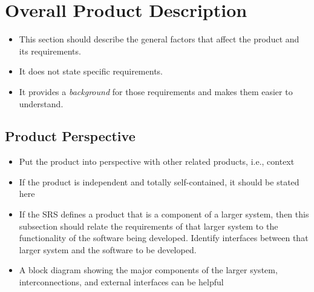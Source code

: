 \documentclass[]{article}
\begin{document}

\section{Overall Product Description}
\label{sec:overall_description}

\begin{itemize}
	\item This section should describe the general factors that affect the product and its requirements. 
	\item It does not state specific requirements.
	\item It provides a \emph{background} for those requirements and makes them easier to understand.
\end{itemize}


\subsection{Product Perspective}
\label{sub:product_perspective}
\begin{itemize}
	\item Put the product into perspective with other related products, i.e., context
	\item If the product is independent and totally self-contained, it should be stated here
	\item If the SRS defines a product that is a component of a larger system, then this subsection should relate the requirements of that larger system to the functionality of the software being developed. Identify interfaces between that larger system and the software to be developed.
	\item A block diagram showing the major components of the larger system, interconnections, and external interfaces can be helpful
\end{itemize}
\end{document}
